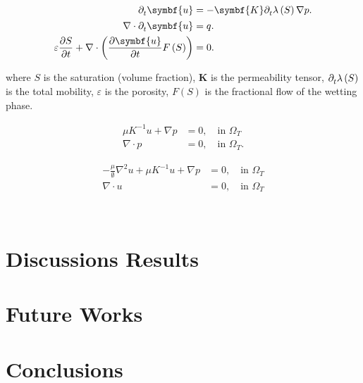 \begin{align*}
	\difcp{\symbf{u}}{t}                                        & =
	-\symbf{K}\difcp{\lambda}{t}\left(S\right)\nabla p.               \\
	\nabla\cdot \difcp{\symbf{u}}{t}                            & =
	q.                                                                \\
	\varepsilon\diffp{S}{t}+
	\nabla\cdot\left(\diffp{\symbf{u}}{t}F\left(S\right)\right) & =0.
\end{align*}

where $S$ is the saturation (volume fraction),
$\symbf{K}$ is the permeability tensor,
$\difcp{\lambda}{t}\left(S\right)$ is the total mobility,
$\varepsilon$ is the porosity, $F\left(S\right)$ is the fractional flow
of the wetting phase.

\begin{align*}
	\mu K^{-1}u+\nabla p & =0,\quad\text{in }\Omega_{T}  \\
	\nabla\cdot p        & =0,\quad\text{in }\Omega_{T}.
\end{align*}


\begin{align*}
	-\frac{\mu}{\emptyset}\nabla^{2}u+\mu K^{-1}u+\nabla p & =0,\quad\text{in }\Omega_{T} \\
	\nabla\cdot u                                          & =0,\quad\text{in }\Omega_{T}
\end{align*}

~\cite{Brinkman1949}

\section{Discussions Results}


\section{Future Works}


\section{Conclusions}





